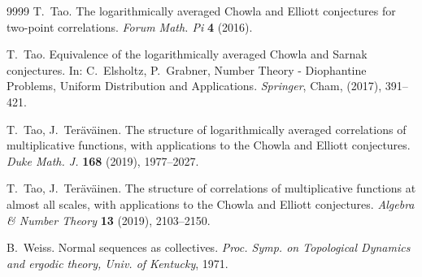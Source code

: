 \documentclass[11pt]{amsart}
\theoremstyle{definition}
\begin{document}
\begin{thebibliography}{9999}
	 T.~Tao. The logarithmically averaged Chowla and Elliott conjectures for two-point correlations. {\em Forum Math. Pi}  {\bf 4} (2016).
	
	
	T.~Tao.
	Equivalence of the logarithmically averaged Chowla and Sarnak conjectures. In: C.~Elsholtz, P.~Grabner,  Number Theory - Diophantine Problems, Uniform Distribution and Applications. {\em  Springer}, Cham, (2017), 391--421.
	
	 T.~Tao, J.~Ter\"av\"ainen.
	The structure of logarithmically averaged correlations of multiplicative functions, with applications to the Chowla and Elliott conjectures.  	
	{\em Duke Math. J.} 	{\bf 168} (2019), 1977--2027.
	
	 T.~Tao, J.~Ter\"av\"ainen. The structure of correlations of multiplicative functions at almost
	all scales, with applications to the Chowla and Elliott conjectures. {\em Algebra \& Number
	Theory} \textbf{13} (2019), 2103--2150.
	
	 B.~Weiss. Normal sequences as collectives. {\em Proc. Symp. on Topological Dynamics
and ergodic theory, Univ. of Kentucky}, 1971.
\end{thebibliography}
\end{document}
